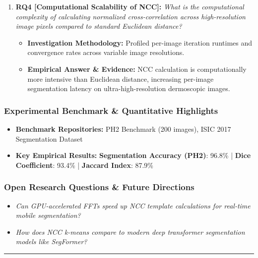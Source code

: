 \begin{enumerate}[label=\textbf{\arabic*.}, leftmargin=*]
\begin{itemize}[leftmargin=1.5em]
  \end{itemize}
  \item \textbf{RQ4 [Computational Scalability of NCC]:} \textit{What is the computational complexity of calculating normalized cross-correlation across high-resolution image pixels compared to standard Euclidean distance?}
  \begin{itemize}[leftmargin=1.5em]
    \item \textbf{Investigation Methodology:} Profiled per-image iteration runtimes and convergence rates across variable image resolutions.
    \item \textbf{Empirical Answer \& Evidence:} NCC calculation is computationally more intensive than Euclidean distance, increasing per-image segmentation latency on ultra-high-resolution dermoscopic images.
  \end{itemize}
\end{enumerate}

\subsubsection*{Experimental Benchmark \& Quantitative Highlights}
\begin{itemize}[leftmargin=*]
  \item \textbf{Benchmark Repositories:} PH2 Benchmark (200 images), ISIC 2017 Segmentation Dataset
  \item \textbf{Key Empirical Results:} \textbf{Segmentation Accuracy (PH2)}: 96.8\% \quad | \quad \textbf{Dice Coefficient}: 93.4\% \quad | \quad \textbf{Jaccard Index}: 87.9\%
\end{itemize}

\subsubsection*{Open Research Questions \& Future Directions}
\begin{itemize}[leftmargin=*]
  \item \textit{Can GPU-accelerated FFTs speed up NCC template calculations for real-time mobile segmentation?}
  \item \textit{How does NCC k-means compare to modern deep transformer segmentation models like SegFormer?}
\end{itemize}
\vspace{0.8em}\hrule\vspace{1.2em}
